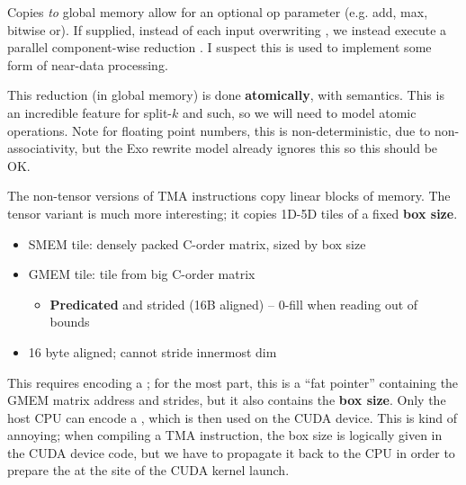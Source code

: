 \filbreak
Copies \textit{to} global memory allow for an optional  op parameter (e.g. add, max, bitwise or).
If supplied, instead of each input  overwriting , we instead execute a parallel component-wise reduction .
I suspect this is used to implement some form of near-data processing.

\filbreak
This reduction (in global memory) is done \textbf{atomically}, with  semantics.
This is an incredible feature for split-$k$ and such, so we will need to model atomic operations.
Note for floating point numbers, this is non-deterministic, due to non-associativity, but the Exo rewrite model already ignores this so this should be OK.

\filbreak
The non-tensor versions of TMA instructions copy linear blocks of memory.
The tensor variant is much more interesting; it copies 1D-5D tiles of a fixed \textbf{box size}.

\begin{itemize}
\item SMEM tile: densely packed C-order matrix, sized by box size
\item GMEM tile: tile from big C-order matrix
\begin{itemize}
  \item \textbf{Predicated} and strided (16B aligned) -- 0-fill when reading out of bounds
\end{itemize}
\item 16 byte aligned; cannot stride innermost dim
\end{itemize}


This requires encoding a ; for the most part, this is a ``fat pointer'' containing the GMEM matrix address and strides, but it also contains the \textbf{box size}.
Only the host CPU can encode a , which is then used on the CUDA device.
This is kind of annoying; when compiling a TMA instruction, the box size is logically given in the CUDA device code, but we have to propagate it back to the CPU in order to prepare the  at the site of the CUDA kernel launch.

